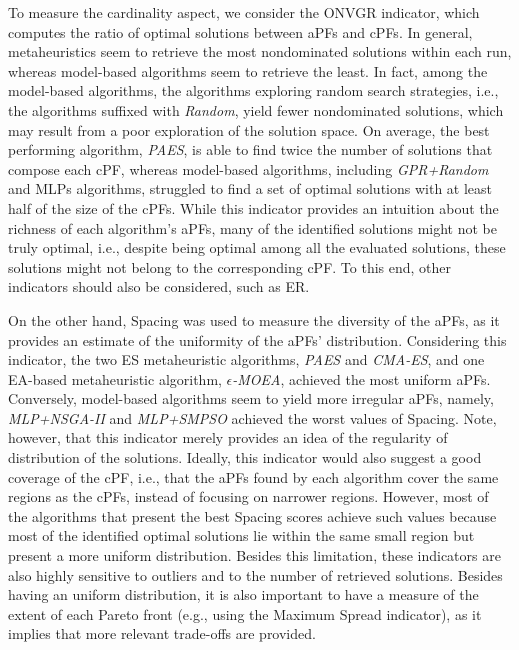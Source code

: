 To measure the cardinality aspect, we consider the \ac{ONVGR} indicator, which computes the ratio of optimal solutions between \acp{aPF} and \acp{cPF}. In general, metaheuristics seem to retrieve the most nondominated solutions within each run, whereas model-based algorithms seem to retrieve the least. In fact, among the model-based algorithms, the algorithms exploring random search strategies, i.e., the algorithms suffixed with \textit{Random}, yield fewer nondominated solutions, which may result from a poor exploration of the solution space. On average, the best performing algorithm, \textit{PAES}, is able to find twice the number of solutions that compose each \ac{cPF}, whereas model-based algorithms, including \textit{GPR+Random} and \acp{MLP} algorithms, struggled to find a set of optimal solutions with at least half of the size of the \acp{cPF}. While this indicator provides an intuition about the richness of each algorithm's \acp{aPF}, many of the identified solutions might not be truly optimal, i.e., despite being optimal among all the evaluated solutions, these solutions might not belong to the corresponding \ac{cPF}. To this end, other indicators should also be considered, such as \ac{ER}.

On the other hand, Spacing was used to measure the diversity of the \acp{aPF}, as it provides an estimate of the uniformity of the \acp{aPF}' distribution. Considering this indicator, the two \ac{ES} metaheuristic algorithms, \textit{PAES} and \textit{CMA-ES}, and one \ac{EA}-based metaheuristic algorithm, $\epsilon$\textit{-MOEA}, achieved the most uniform \acp{aPF}. Conversely, model-based algorithms seem to yield more irregular \acp{aPF}, namely, \textit{MLP+NSGA-II} and \textit{MLP+SMPSO} achieved the worst values of Spacing. Note, however, that this indicator merely provides an idea of the regularity of distribution of the solutions. Ideally, this indicator would also suggest a good coverage of the \ac{cPF}, i.e., that the \acp{aPF} found by each algorithm cover the same regions as the \acp{cPF}, instead of focusing on narrower regions. However, most of the algorithms that present the best Spacing scores achieve such values because most of the identified optimal solutions lie within the same small region but present a more uniform distribution. Besides this limitation, these indicators are also highly sensitive to outliers and to the number of retrieved solutions. Besides having an uniform distribution, it is also important to have a measure of the extent of each Pareto front (e.g., using the Maximum Spread indicator), as it implies that more relevant trade-offs are provided.

